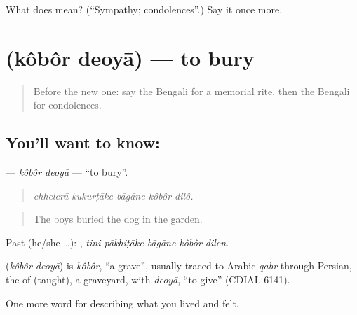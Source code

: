 \begin{tcolorbox}[breakable,colback=teal!4,colframe=teal!35!black,title={Before you move on}]
What does  mean? (\textquotedblleft{}Sympathy; condolences\textquotedblright{}.) Say it once more.
\end{tcolorbox}
\section[\texorpdfstring{\bn{কবর} \bn{দেওয়া} (kôbôr deoyā)}{কবর দেওয়া (kôbôr deoyā)}]{  (kôbôr deoyā) — to bury}

\label{lesson:BN-C491-kobor-deoya}



\begin{quote}
Before the new one: say the Bengali for a memorial rite, then the Bengali for condolences.
\end{quote}

\subsection*{You'll want to know:  }
\textbf{ } — \emph{kôbôr deoyā} — \textquotedblleft{}to bury\textquotedblright{}.

\begin{quote}
    
\end{quote}

\begin{quote}
\emph{chhelerā kukurṭāke bāgāne kôbôr dilô.}
\end{quote}

\begin{quote}
The boys buried the dog in the garden.
\end{quote}

Past (he/she …):     , \emph{tini pākhiṭāke bāgāne kôbôr dilen}.

\begin{cousinweb}
\textbf{ } (\emph{kôbôr deoyā}) is \emph{kôbôr}, \textquotedblleft{}a grave\textquotedblright{}, usually traced to Arabic \emph{qabr} through Persian, the  of  (taught), a graveyard, with \emph{deoyā}, \textquotedblleft{}to give\textquotedblright{} (CDIAL 6141).
\end{cousinweb}

\begin{grammarlens}[title={What you've built}]
One more word for describing what you lived and felt.
\end{grammarlens}

